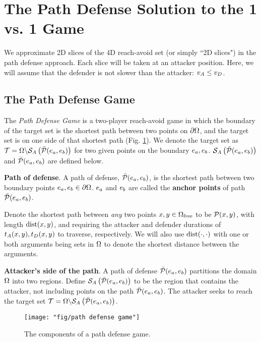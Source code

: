 \section{The Path Defense Solution to the 1 vs. 1 Game}
\label{sec:path_defense}
We approximate 2D slices of the 4D reach-avoid set (or simply ``2D slices") in the path defense approach. Each slice will be taken at an attacker position. Here, we will assume that the defender is not slower than the attacker: $v_A \leq v_D$. 

\subsection{The Path Defense Game}
\label{subsec:pd_game}
The \textit{Path Defense Game} is a two-player reach-avoid game in which the boundary of the target set is the shortest path between two points on $\partial\Omega$, and the target set is on one side of that shortest path (Fig. \ref{fig:pd_form}). We denote the target set as $\mathcal{T}=\Omega\backslash\mathcal{S}_A\left(\bar{\mathcal{P}}(e_a,e_b)\right)$ for two given points on the boundary $e_a,e_b$. $\mathcal{S}_A\left(\bar{\mathcal{P}}(e_a,e_b)\right)$ and $\bar{\mathcal{P}}(e_a,e_b)$ are defined below. 

\begin{defn} %
\textbf{Path of defense}. A path of defense, $\bar{\mathcal{P}}(e_a,e_b)$, is the shortest path between two boundary points $e_a,e_b\in\partial\Omega$. $e_a$ and $e_b$ are called the \textbf{anchor points} of path $\bar{\mathcal{P}}(e_a,e_b)$. 
\end{defn}

Denote the shortest path between \textit{any} two points $x,y\in\Omega_{\text{free}}$ to be $\mathcal{P}(x,y)$, with length $\text{dist}(x,y)$, and requiring the attacker and defender durations of $t_A(x, y),t_D(x,y)$ to traverse, respectively. We will also use $\text{dist}(\cdot,\cdot)$ with one or both arguments being sets in $\Omega$ to denote the shortest distance between the arguments.

\begin{defn} %
\textbf{Attacker's side of the path}. A path of defense $\bar{\mathcal{P}}(e_a,e_b)$ partitions the domain $\Omega$ into two regions. Define $\mathcal{S}_A\left(\bar{\mathcal{P}}(e_a,e_b)\right)$ to be the region that contains the attacker, not including points on the path $\bar{\mathcal{P}}(e_a,e_b)$. The attacker seeks to reach the target set $\mathcal{T}=\Omega\backslash\mathcal{S}_A\left(\bar{\mathcal{P}}(e_a,e_b)\right)$.
\end{defn}

\begin{figure}
\centering
\texttt{[image: "fig/path defense game"]}
\caption{The components of a path defense game.}
\label{fig:pd_form}
\end{figure}

